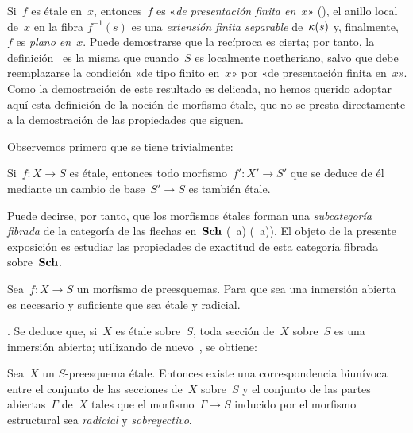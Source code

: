 \begin{remarques}
\label{IX.1.2}
Si~$f$ es étale en~$x$, entonces~$f$ es «\emph{de presentación finita
en}~$x$» (), el anillo local de~$x$ en la fibra
$f^{-1}(s)$ es una \emph{extensión finita separable} de~$\kappa(s)$ y,
finalmente, $f$ es \emph{plano en}~$x$. Puede demostrarse que la recíproca
es cierta; por tanto, la definición~ es la misma que cuando~$S$
es localmente noetheriano, salvo que debe reemplazarse la condición «de
tipo finito en~$x$» por «de presentación finita en~$x$». Como la
demostración de este resultado es delicada, no hemos querido adoptar aquí
esta definición de la noción de morfismo étale, que no se presta
directamente a la demostración de las propiedades que siguen.
\end{remarques}

Observemos primero que se tiene trivialmente:
\begin{proposition}
\label{IX.1.3}
Si~$f\colon X\to S$ es étale, entonces todo morfismo~$f'\colon X'\to S'$
que se deduce de él mediante un cambio de base~$S'\to S$ es también étale.
\end{proposition}

Puede decirse, por tanto, que los morfismos étales forman una
\emph{subcategoría fibrada} de la categoría de las flechas en~$\mathbf{Sch}$
{(\cf {}~a)}
{(\cf {}~a))}. El objeto de la presente exposición es estudiar
las propiedades de exactitud de esta categoría fibrada sobre~$\mathbf{Sch}$.
\begin{proposition}
\label{IX.1.4}
Sea~$f\colon X\to S$ un morfismo de preesquemas. Para que sea una inmersión
abierta es necesario y suficiente que sea étale y radicial.
\end{proposition}

\Cf {}. Se deduce que, si~$X$ es étale sobre~$S$, toda sección
de~$X$ sobre~$S$ es una inmersión abierta; utilizando de nuevo~,
se obtiene:
\begin{corollaire}
\label{IX.1.5}
Sea~$X$ un $S$-preesquema étale. Entonces existe una correspondencia
biunívoca entre el conjunto de las secciones de~$X$ sobre~$S$ y el conjunto
de las partes
abiertas~$\Gamma$ de~$X$ tales que el morfismo~$\Gamma\to S$ inducido por
el morfismo estructural sea \emph{radicial} y \emph{sobreyectivo}.
\end{corollaire}

